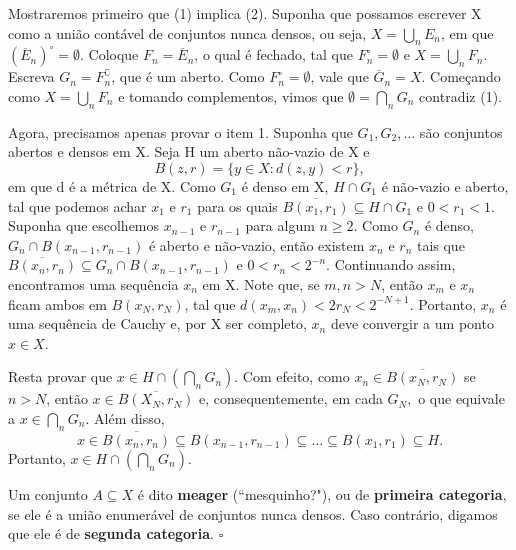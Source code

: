 \documentclass[measure_theory.tex]{subfiles}
\begin{document}
\begin{proof*}
	Mostraremos primeiro que (1) implica (2). Suponha que possamos escrever X como a união contável de conjuntos nunca densos, ou seja, \(X = \bigcup_{n}^{}E_{n}\), em que \((\overline{E}_{n})^{\circ } = \emptyset .\) Coloque \(F_{n} = \overline{E}_{n}\), o qual é fechado, tal que
	\(F_{n}^{\circ } = \emptyset \) e \(X = \bigcup_{n}^{}F_{n}.\) Escreva \(G_{n} = F_{n}^{\complement}\), que é um aberto. Como \(F_{n}^{\circ } = \emptyset \), vale que \(\overline{G}_{n} = X.\) Começando como \(X = \bigcup_{n}^{}F_{n}\) e tomando complementos, vimos que \(\emptyset = \bigcap_{n}^{}G_{n}\) contradiz (1).

	Agora, precisamos apenas provar o item 1. Suponha que \(G_1, G_2, \dotsc \) são conjuntos abertos e densos em X. Seja H um aberto não-vazio de X e
	\[
		B(z, r) = \{y\in X: d(z, y) < r\},
	\]
	em que d é a métrica de X. Como \(G_{1}\) é denso em X, \(H\cap G_1\) é não-vazio e aberto, tal que podemos achar \(x_1\) e \(r_1\) para os quais \(\overline{B(x_1, r_1)}\subseteq H\cap G_1\) e \(0 < r_1 < 1.\) Suponha que escolhemos
	\(x_{n-1}\) e \(r_{n-1}\) para algum \(n\geq 2\). Como \(G_{n}\) é denso, \(G_{n}\cap B(x_{n-1}, r_{n-1})\) é aberto e não-vazio, então existem \(x_{n}\) e \(r_{n}\) tais que \(\overline{B(x_{n}, r_{n})}\subseteq G_{n}\cap B(x_{n-1}, r_{n-1})\) e \(0< r_{n} < 2^{-n}.\) Continuando assim, encontramos uma sequência \(x_{n}\) em X.
	Note que, se \(m, n > N\), então \(x_{m}\) e \(x_{n}\) ficam ambos em \(B(x_{N}, r_{N})\), tal que \(d(x_{m}, x_{n}) < 2r_{N} < 2^{-N+1}.\) Portanto, \(x_{n}\) é uma sequência de Cauchy e, por X ser completo, \(x_{n}\) deve convergir a um ponto \(x\in X\).

	Resta provar que \(x\in H \cap (\bigcap_{n}^{}G_{n})\). Com efeito, como \(x_{n}\in \overline{B(x_{N}, r_{N})}\) se \(n > N\), então \(x\in \overline{B(X_{N}, r_{N})} \) e, consequentemente, em cada \(G_{N},\) o que equivale a \(x\in \bigcap_{n}^{}G_{n}\). Além disso,
	\[
		x\in \overline{B(x_{n}, r_{n})}\subseteq B(x_{n-1}, r_{n-1})\subseteq \dotsc \subseteq B(x_1, r_1)\subseteq H.
	\]
	Portanto, \(x\in H\cap (\bigcap_{n}^{}G_{n})\). \qedsymbol
\end{proof*}
\begin{def*}
	Um conjunto \(A\subseteq X\) é dito \textbf{meager} (``mesquinho?"), ou de \textbf{primeira categoria}, se ele é a união enumerável de conjuntos nunca densos. Caso contrário, digamos que ele é de \textbf{segunda categoria}. \(\square\)
\end{def*}
\end{document}
